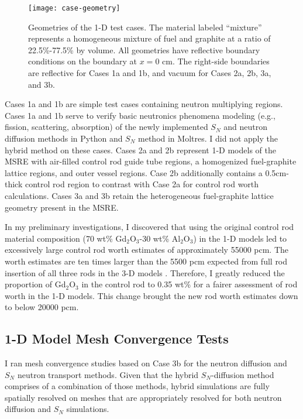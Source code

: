 \begin{figure}[htb!]
  \centering
  \texttt{[image: case-geometry]}
  \caption{Geometries of the 1-D test cases. The material labeled ``mixture'' represents a
    homogeneous mixture of fuel and graphite at a ratio of 22.5\%-77.5\% by volume. All geometries
    have reflective boundary conditions on the boundary at $x=0$ cm. The right-side boundaries are
    reflective for Cases 1a and 1b, and vacuum for Cases 2a, 2b, 3a, and 3b.}
  \label{fig:case-geom}
\end{figure}

Cases 1a and 1b are simple test cases containing neutron multiplying regions. Cases 1a and 1b serve
to verify basic neutronics phenomena modeling (e.g., fission, scattering, absorption) of the newly
implemented $S_N$ and neutron diffusion methods in Python and $S_N$ method in Moltres. I did not
apply the hybrid method on these cases. Cases 2a and 2b represent 1-D models of the \gls{MSRE} with
air-filled control rod guide tube regions, a homogenized fuel-graphite lattice regions, and outer
vessel regions. Case 2b additionally contains a 0.5cm-thick control rod region to contrast with
Case 2a for control rod worth calculations. Cases 3a and 3b retain the heterogeneous fuel-graphite
lattice geometry present in the \gls{MSRE}.

In my preliminary investigations, I discovered that using the original control rod material
composition (70 wt\% Gd$_2$O$_3$-30 wt\% Al$_2$O$_3$) in the 1-D models led to excessively large
control rod worth estimates of approximately 55000 pcm. The worth estimates are ten times larger
than the 5500 pcm expected from full rod insertion of all three rods in the 3-D models
\cite{fratoni_molten_2020}. Therefore, I greatly reduced the proportion of Gd$_2$O$_3$ in the
control rod to 0.35 wt\% for a fairer assessment of rod worth in the 1-D models. This change
brought the new rod worth estimates down to below 20000 pcm.

\subsection{1-D Model Mesh Convergence Tests}

I ran mesh convergence studies based on Case 3b for the neutron diffusion and $S_N$ neutron
transport methods. Given that the hybrid $S_N$-diffusion method comprises of a combination of those
methods, hybrid simulations are fully spatially resolved on meshes that are appropriately resolved
for both neutron diffusion and $S_N$ simulations.

